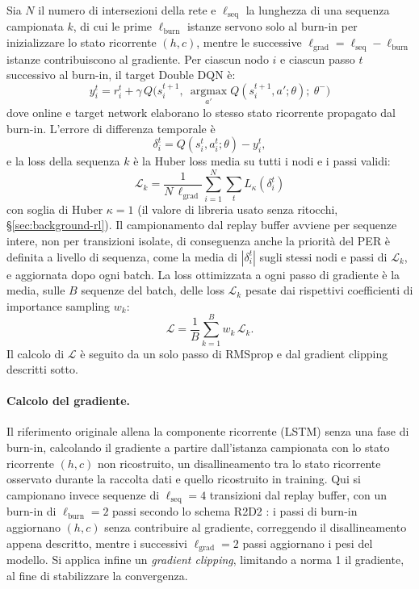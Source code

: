 Sia $N$ il numero di intersezioni della rete e $\ell_{\text{seq}}$ la lunghezza di una sequenza campionata $k$,
di cui le prime $\ell_{\text{burn}}$ istanze servono solo al burn-in per inizializzare lo stato ricorrente $(h,c)$,
mentre le successive $\ell_{\text{grad}} = \ell_{\text{seq}} - \ell_{\text{burn}}$ istanze contribuiscono al gradiente.
Per ciascun nodo $i$ e ciascun passo $t$ successivo al burn-in, il target Double DQN è:
\begin{equation}
  y_i^t = r_i^t + \gamma\, Q\big(s_i^{t+1},\ \operatorname*{argmax}_{a'} Q(s_i^{t+1}, a'; \theta);\ \theta^-\big)
  \label{eq:double-dqn-target}
\end{equation}
dove online e target network elaborano lo stesso stato ricorrente propagato dal burn-in.
L'errore di differenza temporale è
\[\delta_i^t = Q(s_i^t, a_i^t; \theta) - y_i^t,\]
e la loss della sequenza $k$ è la Huber loss media su tutti i nodi e i passi
validi:
\begin{equation}
  \mathcal{L}_k = \frac{1}{N\,\ell_{\text{grad}}} \sum_{i=1}^{N} \sum_{t} L_\kappa(\delta_i^t)
  \label{eq:sequence-loss}
\end{equation}
con soglia di Huber $\kappa=1$ (il valore di libreria usato senza
ritocchi, §\ref{sec:background-rl}). Il campionamento dal replay buffer
avviene per sequenze intere, non per transizioni isolate, di conseguenza
anche la priorità del PER è definita a livello di sequenza, come la media
di $|\delta_i^t|$ sugli stessi nodi e passi di $\mathcal{L}_k$, e
aggiornata dopo ogni batch. La loss ottimizzata a ogni passo di gradiente
è la media, sulle $B$ sequenze del batch, delle loss $\mathcal{L}_k$
pesate dai rispettivi coefficienti di importance sampling $w_k$:
\begin{equation}
  \mathcal{L} = \frac{1}{B} \sum_{k=1}^{B} w_k\, \mathcal{L}_k .
  \label{eq:batch-loss}
\end{equation}
Il calcolo di \(\mathcal{L}\) è seguito da un solo passo di RMSprop e dal
gradient clipping descritti sotto.

\paragraph{Calcolo del gradiente.} Il riferimento originale allena la
componente ricorrente (LSTM) senza una fase di burn-in, calcolando il
gradiente a partire dall'istanza campionata con lo stato ricorrente
$(h,c)$ non ricostruito, un disallineamento tra lo stato ricorrente
osservato durante la raccolta dati e quello ricostruito in training. Qui
si campionano invece sequenze di $\ell_{\text{seq}}=4$ transizioni dal
replay buffer, con un burn-in di $\ell_{\text{burn}}=2$ passi secondo lo schema
R2D2 \citep{kapturowski2019r2d2}: i passi di burn-in aggiornano $(h,c)$
senza contribuire al gradiente, correggendo il disallineamento appena
descritto, mentre i successivi $\ell_{\text{grad}}=2$ passi aggiornano i pesi
del modello. Si applica infine un \emph{gradient clipping}, limitando a
norma 1 il gradiente, al fine di stabilizzare la convergenza.

